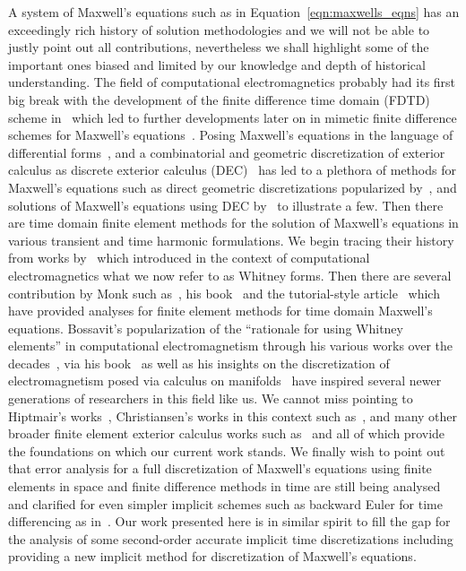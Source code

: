 \documentclass{amsart}
\theoremstyle{thmstyleone}%
\theoremstyle{thmstyletwo}%
\theoremstyle{thmstylethree}%
\begin{document}
A system of Maxwell's equations such as in Equation~\eqref{eqn:maxwells_eqns} has an exceedingly rich history of solution methodologies and we will not be able to justly point out all contributions, nevertheless we shall highlight some of the important ones biased and limited by our knowledge and depth of historical understanding. The field of computational electromagnetics probably had its first big break with the development of the finite difference time domain (FDTD) scheme in~\cite{Yee1966} which led to further developments later on in mimetic finite difference schemes for Maxwell's equations~\cite{HySh1999, Bossavit2001, LiMaSh2014, AdCaHuZi2021}. Posing Maxwell's equations in the language of differential forms~\cite{Deschamps1981}, and a combinatorial and geometric discretization of exterior calculus as discrete exterior calculus (DEC)~\cite{Hirani2003} has led to a plethora of methods for Maxwell's equations such as direct geometric discretizations popularized by~\cite{Tonti2001, Tonti2001a, Tonti2002}, and solutions of Maxwell's equations using DEC by~\cite{Rabina2014, RaMoRo2015, ChCh2017, SaPo2018, ZhNaJiCh2023} to illustrate a few. Then there are time domain finite element methods for the solution of Maxwell's equations in various transient and time harmonic formulations. We begin tracing their history from works by~\cite{Nedelec1978, Nedelec1980, Nedelec1986} which introduced in the context of computational electromagnetics what we now refer to as Whitney forms. Then there are several contribution by Monk such as~\cite{Monk1992, Monk1992a, MaMo1995}, his book~\cite{Monk2003} and the tutorial-style article~\cite{ChMo2012} which have provided analyses for finite element methods for time domain Maxwell's equations. Bossavit's popularization of the ``rationale for using Whitney elements'' in computational electromagnetism through his various works over the decades~\cite{Bossavit1988, Bossavit1988a, Bossavit1990, Bossavit1992}, via his book~\cite{Bossavit1998a} as well as his insights on the discretization of electromagnetism posed via calculus on manifolds~\cite{Bossavit1991, Bossavit1998, Bossavit2010} have inspired several newer generations of researchers in this field like us. We cannot miss pointing to Hiptmair's works~\cite{Hiptmair1999, Hiptmair2002, Hiptmair2015}, Christiansen's works in this context such as~\cite{Christiansen2009}, and many other broader finite element exterior calculus works such as~\cite{RaBo2009, RaBo2009a, CHMuOw2011_AN, BoRa2014, ChRa2016} and all of which provide the foundations on which our current work stands. We finally wish to point out that error analysis for a full discretization of Maxwell's equations using finite elements in space and finite difference methods in time are still being analysed and clarified for even simpler implicit schemes such as backward Euler for time differencing as in~\cite{AnAn2019}. Our work presented here is in similar spirit to fill the gap for the analysis of some second-order accurate implicit time discretizations including providing a new implicit method for discretization of Maxwell's equations.
\end{document}
